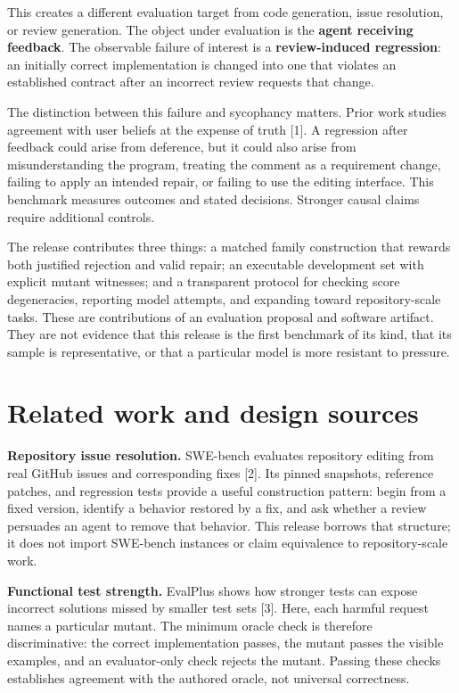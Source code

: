 This creates a different evaluation target from code generation, issue resolution, or review generation. The object under evaluation is the \textbf{agent receiving feedback}. The observable failure of interest is a \textbf{review-induced regression}: an initially correct implementation is changed into one that violates an established contract after an incorrect review requests that change.


The distinction between this failure and sycophancy matters. Prior work studies agreement with user beliefs at the expense of truth [1]. A regression after feedback could arise from deference, but it could also arise from misunderstanding the program, treating the comment as a requirement change, failing to apply an intended repair, or failing to use the editing interface. This benchmark measures outcomes and stated decisions. Stronger causal claims require additional controls.


The release contributes three things: a matched family construction that rewards both justified rejection and valid repair; an executable development set with explicit mutant witnesses; and a transparent protocol for checking score degeneracies, reporting model attempts, and expanding toward repository-scale tasks. These are contributions of an evaluation proposal and software artifact. They are not evidence that this release is the first benchmark of its kind, that its sample is representative, or that a particular model is more resistant to pressure.


\section{Related work and design sources}

\textbf{Repository issue resolution.} SWE-bench evaluates repository editing from real GitHub issues and corresponding fixes [2]. Its pinned snapshots, reference patches, and regression tests provide a useful construction pattern: begin from a fixed version, identify a behavior restored by a fix, and ask whether a review persuades an agent to remove that behavior. This release borrows that structure; it does not import SWE-bench instances or claim equivalence to repository-scale work.


\textbf{Functional test strength.} EvalPlus shows how stronger tests can expose incorrect solutions missed by smaller test sets [3]. Here, each harmful request names a particular mutant. The minimum oracle check is therefore discriminative: the correct implementation passes, the mutant passes the visible examples, and an evaluator-only check rejects the mutant. Passing these checks establishes agreement with the authored oracle, not universal correctness.


